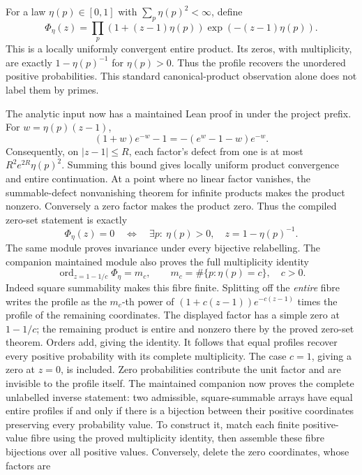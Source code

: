 \documentclass[11pt]{article}
\theoremstyle{definition}
\begin{document}
For a law $\eta(p)\in[0,1]$ with $\sum_p\eta(p)^2<\infty$, define
\[
 \Phi_\eta(z)=\prod_p
 (1+(z-1)\eta(p))\exp(-(z-1)\eta(p)).
\]
This is a locally uniformly convergent entire product. Its zeros,
with multiplicity, are exactly $1-\eta(p)^{-1}$ for $\eta(p)>0$.
Thus the profile recovers the unordered positive probabilities.
This standard canonical-product observation alone does not label
them by primes.

The analytic input now has a maintained Lean proof in
under the project prefix. For $w=\eta(p)(z-1)$,
\[
 (1+w)e^{-w}-1=-(e^w-1-w)e^{-w}.
\]
Consequently, on $|z-1|\le R$, each factor's defect from one is at most
$R^2e^{2R}\eta(p)^2$. Summing this bound gives locally uniform product
convergence and entire continuation. At a point where no linear factor
vanishes, the summable-defect nonvanishing theorem for infinite products
makes the product nonzero. Conversely a zero factor makes the product zero.
Thus the compiled zero-set statement is exactly
\[
 \Phi_\eta(z)=0
 \quad\Longleftrightarrow\quad
 \exists p:\ \eta(p)>0,\quad z=1-\eta(p)^{-1}.
\]
The same module proves invariance under every bijective relabelling.
The companion maintained module
also proves the full multiplicity identity
\[
 \operatorname{ord}_{z=1-1/c}\Phi_\eta
   = m_c,\qquad m_c=\#\{p:\eta(p)=c\},\quad c>0.
\]
Indeed square summability makes this fibre finite. Splitting off the
\emph{entire} fibre writes the profile as the $m_c$-th power of
$(1+c(z-1))e^{-c(z-1)}$ times the profile of the remaining coordinates.
The displayed factor has a simple zero at $1-1/c$; the remaining product
is entire and nonzero there by the proved zero-set theorem. Orders add,
giving the identity. It follows that equal profiles recover every positive
probability with its complete multiplicity. The case $c=1$, giving a zero
at $z=0$, is included. Zero probabilities contribute the unit factor and
are invisible to the profile itself.
The maintained companion
now proves the complete unlabelled inverse statement: two admissible,
square-summable arrays have equal entire profiles if and only if there is a
bijection between their positive coordinates preserving every probability
value. To construct it, match each finite positive-value fibre using the
proved multiplicity identity, then assemble these fibre bijections over all
positive values. Conversely, delete the zero coordinates, whose factors are
\end{document}
